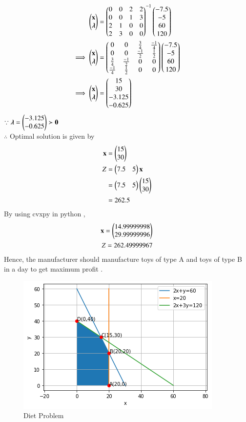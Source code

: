 \documentclass[journal,12pt,twocolumn]{IEEEtran}
\begin{document}
\begin{align}
    \begin{pmatrix}\mathbf{x} \\ \boldsymbol{\lambda}\end{pmatrix} &= \begin{pmatrix}0 & 0 & 2 & 2 \\ 0 & 0 & 1 & 3 \\ 2 & 1 & 0 & 0 \\ 2 & 3 & 0 & 0\end{pmatrix}^{-1}\begin{pmatrix}-7.5 \\ -5 \\ 60 \\ 120\end{pmatrix}
    \\
    \implies   \begin{pmatrix}\mathbf{x} \\ \boldsymbol{\lambda}\end{pmatrix} &= \begin{pmatrix}0 & 0 & \frac{3}{4} & \frac{-1}{4} \\ 0 & 0 & \frac{-1}{2} & \frac{1}{2} \\ \frac{3}{4} & \frac{-1}{2} & 0 & 0 \\ \frac{-1}{4} & \frac{1}{2} & 0 & 0\end{pmatrix}\begin{pmatrix}-7.5 \\ -5 \\ 60 \\ 120\end{pmatrix}
    \\
    \implies \begin{pmatrix}\mathbf{x} \\ \boldsymbol{\lambda}\end{pmatrix} &= \begin{pmatrix}15 \\ 30 \\ -3.125 \\ -0.625\end{pmatrix}
\end{align}
$\because \boldsymbol{\lambda}=\begin{pmatrix}-3.125 \\ -0.625\end{pmatrix} \succ \mathbf{0} $
\\
$\therefore$ Optimal solution is given by
\begin{align}
    \mathbf{x} &= \begin{pmatrix}15\\30\end{pmatrix} \\
    Z &= \begin{pmatrix}7.5 & 5\end{pmatrix}\mathbf{x} \\
    &= \begin{pmatrix}7.5 & 5\end{pmatrix}\begin{pmatrix}15 \\ 30\end{pmatrix} \\
    &= 262.5
\end{align}
By using cvxpy in python ,
\begin{align}
    \mathbf{x}=\begin{pmatrix}14.99999998\\29.99999996\end{pmatrix}\\
    Z = 262.49999967
\end{align}
Hence, the manufacturer should manufacture  toys of type A and  toys of type B in a day to get maximum profit .
\begin{figure}[!ht]
\centering
\includegraphics[width=\columnwidth]{Figure10}
\caption{Diet Problem}
\label{fig:toy problem}	
\end{figure}
\end{document}
